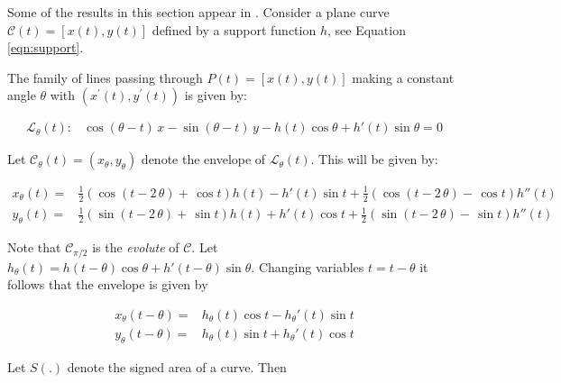 Some of the results in this section appear in \cite{jesus2015,jesus2014}. Consider a plane  curve $\mathcal{C}(t)=[x(t),y(t)]$ defined by a support function $h$, see Equation \eqref{eqn:support}.
 
The family of lines passing through $P(t)=[x(t),y(t)]$ making a constant angle $\theta$ with $(x^\prime(t),y^\prime(t)) $ is given by:

\begin{align*}
 \mathcal{L}_{\theta}(t):&  \cos(\theta-t) \,x -  \sin(\theta-t)\, y - h(t) \cos\theta + h'(t)  \sin\theta = 0
\end{align*}


Let $\mathcal{C}_\theta(t)=(x_\theta,y_\theta)$ denote the envelope of $\mathcal{L}_\theta(t)$. This will be given by:

\begin{align*} x_{\theta}(t)=&\frac{1}{2}  \left( \cos \left( t-2\,\theta \right) + 
  \,\cos t  \right) h \left( t \right) -h'(t)\sin t    +\frac{1}{2} \left(\cos \left( t-2\,\theta 
  \right) - \,\cos t  \right)  h'' \left( t \right) \\
  y_{\theta}(t)=&\frac{1}{2} \left(\sin \left( t-2\,\theta \right)  +
  \,\sin t \right) h(t)   +h'(t)\cos t    +\frac{1}{2} \left(\sin \left( t-2\,\theta 
  \right) - \,\sin t  \right)  h'' (t)
 \end{align*}

\noindent Note that $\mathcal{C}_{\pi/2}$ is the {\em evolute} of $\mathcal{C}$. Let $h_{\theta}(t)=h(t-\theta)\cos\theta +h'(t-\theta)\sin\theta$. Changing variables $t=t-\theta$ it follows that the envelope is  given by
  
\begin{align*}
  x_{\theta}(t-\theta)=&h_{\theta}(t)\cos t-h_{\theta}'(t)\sin t\\
  y_{\theta}(t-\theta)=&h_{\theta}(t)\sin t+h_{\theta}'(t)\cos t
\end{align*}
  
Let $S(.)$ denote the signed area of a curve. Then
  

